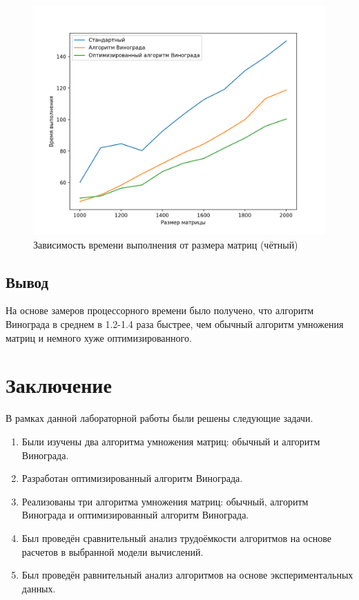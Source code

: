 \documentclass[12pt]{report}
\begin{document}
\begin{figure}[h!p]
	\centering
	\includegraphics[scale = 0.6]{odd.png}
	\caption{Зависимость времени выполнения от размера матриц (чётный)}
	\label{timeOddGraph}
\end{figure}
\section{Вывод}

На основе замеров процессорного времени было получено, что алгоритм Винограда в среднем в 1.2-1.4 раза быстрее, чем обычный алгоритм умножения матриц и немного хуже оптимизированного.

\chapter*{Заключение}

В рамках данной лабораторной работы были решены следующие задачи.
\begin{enumerate}
	\item Были изучены два алгоритма умножения матриц: обычный и алгоритм Винограда.
	\item Разработан оптимизированный алгоритм Винограда.
	\item Реализованы три алгоритма умножения матриц: обычный, алгоритм Винограда и оптимизированный алгоритм Винограда.
	\item Был проведён сравнительный анализ трудоёмкости алгоритмов на основе расчетов в выбранной модели вычислений.
	\item Был проведён равнительный анализ алгоритмов на основе экспериментальных данных.
\end{enumerate}
\end{document}
